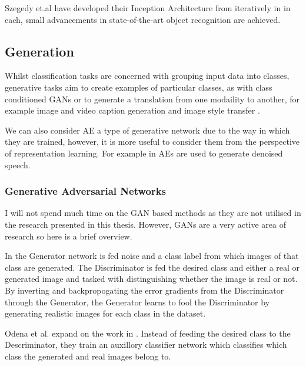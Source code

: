 Szegedy et.al have developed their Inception Architecture from \cite{szegedy2015going} iteratively in \cite{szegedy2016rethinking, szegedy2017inception} in each, small advancements in state-of-the-art object recognition are achieved.


\subsection{Generation}
Whilst classification tasks are concerned with grouping input data into classes, generative tasks aim to create examples of particular classes, as with class conditioned \acp{GAN} \cite{mirza2014conditional, odena2017conditional} or to generate a translation from one modaility to another, for example image and video caption generation \cite{vinyals2015show, lebret2015phrase, donahue2015long, jia2015guiding, rohrbach2014coherent, rohrbach2013translating, yao2015describing, yao2015video, venugopalan2014translating, johnson2016densecap, ordonez2011im2text, sheppard2016video} and image style transfer \cite{zhu2017unpaired}.

We can also consider \ac{AE} a type of generative network due to the way in which they are trained, however, it is more useful to consider them from the perspective of representation learning. For example in \cite{lu2013speech} \acp{AE} are used to generate denoised speech.

\subsubsection{Generative Adversarial Networks}
I will not spend much time on the \ac{GAN} based methods as they are not utilised in the research presented in this thesis. However, \acp{GAN} are a very active area of research so here is a brief overview. 

In \cite{mirza2014conditional} the Generator network is fed noise and a class label from which images of that class are generated. The Discriminator is fed the desired class and either a real or generated image and tasked with distinguishing whether the image is real or not. By inverting and backpropogating the error gradients from the Discriminator through the Generator, the Generator learns to fool the Discriminator by generating realistic images for each class in the dataset.

Odena et al. \cite{odena2017conditional} expand on the work in \cite{mirza2014conditional}. Instead of feeding the desired class to the Descriminator, they train an auxillory classifier network which classifies which class the generated and real images belong to.

